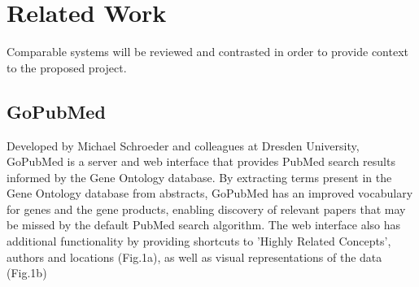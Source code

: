 \documentclass[PROP_AGutteridge_CS.tex]{subfiles}
\begin{document}
\chapter{Related Work}
Comparable systems will be reviewed and contrasted in order to provide context to the proposed project.

\section{GoPubMed}
Developed by Michael Schroeder and colleagues at Dresden University, GoPubMed is a server and web interface that provides PubMed search results informed by the Gene Ontology database\cite{doms}. By extracting terms present in the Gene Ontology database from abstracts, GoPubMed has an improved vocabulary for genes and the gene products, enabling discovery of relevant papers that may be missed by the default PubMed search algorithm. The web interface also has additional functionality by providing shortcuts to 'Highly Related Concepts', authors and locations (Fig.1a), as well as visual representations of the data (Fig.1b) \\
\end{document}

